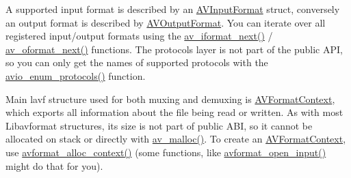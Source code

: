 A supported input format is described by an \hyperlink{struct_a_v_input_format}{A\+V\+Input\+Format} struct, conversely an output format is described by \hyperlink{struct_a_v_output_format}{A\+V\+Output\+Format}. You can iterate over all registered input/output formats using the \hyperlink{group__lavf__core_ga5a9e27c9e2b04abcf6ed2e0f9b68da4f}{av\+\_\+iformat\+\_\+next()} / \hyperlink{group__lavf__core_ga9c169031f490901218b1e6bcd9993967}{av\+\_\+oformat\+\_\+next()} functions. The protocols layer is not part of the public A\+PI, so you can only get the names of supported protocols with the \hyperlink{avio_8h_a50fda7362db877e8b9e493650c9e3fb3}{avio\+\_\+enum\+\_\+protocols()} function.

Main lavf structure used for both muxing and demuxing is \hyperlink{struct_a_v_format_context}{A\+V\+Format\+Context}, which exports all information about the file being read or written. As with most Libavformat structures, its size is not part of public A\+BI, so it cannot be allocated on stack or directly with \hyperlink{group__lavu__mem_gacbca30ebc510a7e4156d66e7aceb2dc8}{av\+\_\+malloc()}. To create an \hyperlink{struct_a_v_format_context}{A\+V\+Format\+Context}, use \hyperlink{group__lavf__core_gac7a91abf2f59648d995894711f070f62}{avformat\+\_\+alloc\+\_\+context()} (some functions, like \hyperlink{group__lavf__decoding_ga10a404346c646e4ab58f4ed798baca32}{avformat\+\_\+open\+\_\+input()} might do that for you).

